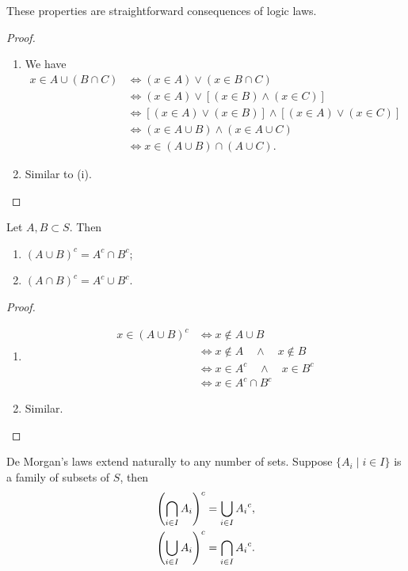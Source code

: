 These properties are straightforward consequences of logic laws.

\begin{proof} \
\begin{enumerate}[label=(\roman*)]
\item We have
\begin{align*}
x\in A\cup(B \cap C)
&\iff (x\in A)\lor(x\in B\cap C)\\
&\iff (x\in A)\lor[(x\in B)\land (x\in C)]\\
&\iff [(x\in A)\lor(x\in B)]\land[(x\in A)\lor(x\in C)]\\
&\iff (x\in A\cup B)\land(x\in A\cup C)\\
&\iff x\in (A\cup B)\cap(A\cup C).
\end{align*}

\item Similar to (i).
\end{enumerate}
\end{proof}

\begin{lemma}
Let $A,B\subset S$. Then
\begin{enumerate}[label=(\roman*)]
\item $(A \cup B)^c = A^c \cap B^c$;
\item $(A \cap B)^c = A^c \cup B^c$.
\end{enumerate}
\end{lemma}

\begin{proof} \
\begin{enumerate}[label=(\roman*)]
\item \begin{align*}
x\in(A\cup B)^c&\iff x\notin A\cup B\\
&\iff x\notin A\quad\land\quad x\notin B\\
&\iff x\in A^c\quad\land\quad x\in B^c\\
&\iff x\in A^c\cap B^c
\end{align*}

\item Similar.
\end{enumerate}
\end{proof}

De Morgan's laws extend naturally to any number of sets. Suppose $\{A_i\mid i\in I\}$ is a family of subsets of $S$, then
\begin{align*}
\left(\bigcap_{i\in I}A_i\right)^c&=\bigcup_{i\in I}{A_i}^c,\\
\left(\bigcup_{i\in I}A_i\right)^c&=\bigcap_{i\in I}{A_i}^c.
\end{align*}

